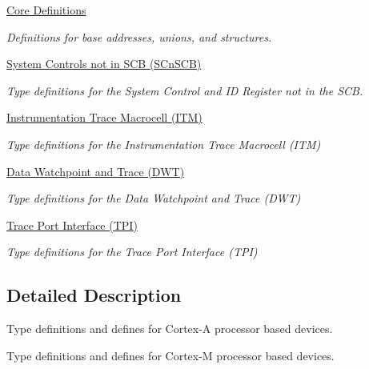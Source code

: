 \begin{DoxyCompactItemize}
\hyperlink{group__CMSIS__core__base}{Core Definitions}
\begin{DoxyCompactList}\small\item\em Definitions for base addresses, unions, and structures. \end{DoxyCompactList}\item 
\hyperlink{group__CMSIS__SCnSCB}{System Controls not in S\+C\+B (\+S\+Cn\+S\+C\+B)}
\begin{DoxyCompactList}\small\item\em Type definitions for the System Control and ID Register not in the S\+CB. \end{DoxyCompactList}\item 
\hyperlink{group__CMSIS__ITM}{Instrumentation Trace Macrocell (\+I\+T\+M)}
\begin{DoxyCompactList}\small\item\em Type definitions for the Instrumentation Trace Macrocell (I\+TM) \end{DoxyCompactList}\item 
\hyperlink{group__CMSIS__DWT}{Data Watchpoint and Trace (\+D\+W\+T)}
\begin{DoxyCompactList}\small\item\em Type definitions for the Data Watchpoint and Trace (D\+WT) \end{DoxyCompactList}\item 
\hyperlink{group__CMSIS__TPI}{Trace Port Interface (\+T\+P\+I)}
\begin{DoxyCompactList}\small\item\em Type definitions for the Trace Port Interface (T\+PI) \end{DoxyCompactList}\end{DoxyCompactItemize}


\subsection{Detailed Description}
Type definitions and defines for Cortex-\/A processor based devices. 

Type definitions and defines for Cortex-\/M processor based devices.